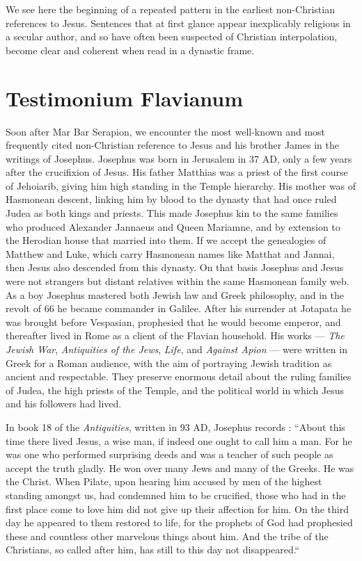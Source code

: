 We see here the beginning of a repeated pattern in the earliest non-Christian references to Jesus.
Sentences that at first glance appear inexplicably religious in a secular author, and so have often been suspected of Christian interpolation, become clear and coherent when read in a dynastic frame.

\section{Testimonium Flavianum}\label{sec:testimonium-flavianum}

Soon after Mar Bar Serapion, we encounter the most well-known and most frequently cited non-Christian reference to Jesus and his brother James in the writings of Josephus.
Josephus was born in Jerusalem in 37 AD, only a few years after the crucifixion of Jesus.
His father Matthias was a priest of the first course of Jehoiarib, giving him high standing in the Temple hierarchy.
His mother was of Hasmonean descent, linking him by blood to the dynasty that had once ruled Judea as both kings and priests.
This made Josephus kin to the same families who produced Alexander Jannaeus and Queen Mariamne, and by extension to the Herodian house that married into them.
If we accept the genealogies of Matthew and Luke, which carry Hasmonean names like Matthat and Jannai, then Jesus also descended from this dynasty.
On that basis Josephus and Jesus were not strangers but distant relatives within the same Hasmonean family web.
As a boy Josephus mastered both Jewish law and Greek philosophy, and in the revolt of 66 he became commander in Galilee.
After his surrender at Jotapata he was brought before Vespasian, prophesied that he would become emperor, and thereafter lived in Rome as a client of the Flavian household.
His works --- \emph{The Jewish War}, \emph{Antiquities of the Jews}, \emph{Life}, and \emph{Against Apion} --- were written in Greek for a Roman audience, with the aim of portraying Jewish tradition as ancient and respectable.
They preserve enormous detail about the ruling families of Judea, the high priests of the Temple, and the political world in which Jesus and his followers had lived.

In book 18 of the \emph{Antiquities}, written in 93 AD, Josephus records \cite[18.63--64]{josephus:ant}:
``About this time there lived Jesus, a wise man, if indeed one ought to call him a man.
For he was one who performed surprising deeds and was a teacher of such people as accept the truth gladly.
He won over many Jews and many of the Greeks.
He was the Christ.
When Pilate, upon hearing him accused by men of the highest standing amongst us, had condemned him to be crucified, those who had in the first place come to love him did not give up their affection for him.
On the third day he appeared to them restored to life, for the prophets of God had prophesied these and countless other marvelous things about him.
And the tribe of the Christians, so called after him, has still to this day not disappeared.``

